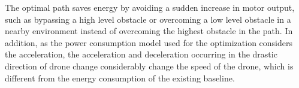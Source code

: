 \documentclass[journal]{./template/IEEEtran}
\begin{document}
The optimal path saves energy by avoiding a sudden increase in motor output, such as bypassing a high level obstacle or overcoming a low level obstacle in a nearby environment instead of overcoming the highest obstacle in the path.
In addition, as the power consumption model used for the optimization considers the acceleration, the acceleration and deceleration occurring in the drastic direction of drone change considerably change the speed of the drone, which is different from the energy consumption of the existing baseline.

\begin{figure}[ht!p!b]
\centering
{}

\end{figure}
\end{document}
